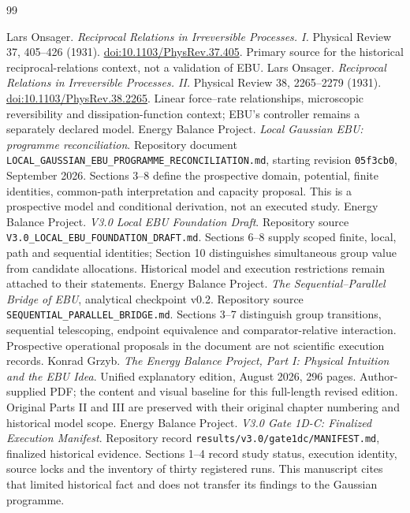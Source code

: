 \renewcommand{\bibname}{References and source map}
\begin{thebibliography}{99}
\raggedright

 Lars Onsager. \emph{Reciprocal Relations in Irreversible Processes. I.} Physical Review 37, 405--426 (1931). \href{https://doi.org/10.1103/PhysRev.37.405}{doi:10.1103/PhysRev.37.405}. Primary source for the historical reciprocal-relations context, not a validation of EBU.
 Lars Onsager. \emph{Reciprocal Relations in Irreversible Processes. II.} Physical Review 38, 2265--2279 (1931). \href{https://doi.org/10.1103/PhysRev.38.2265}{doi:10.1103/PhysRev.38.2265}. Linear force--rate relationships, microscopic reversibility and dissipation-function context; EBU's controller remains a separately declared model.
 Energy Balance Project. \emph{Local Gaussian EBU: programme reconciliation}. Repository document \texttt{LOCAL\_GAUSSIAN\_EBU\_PROGRAMME\_RECONCILIATION.md}, starting revision \texttt{05f3cb0}, September 2026. Sections 3--8 define the prospective domain, potential, finite identities, common-path interpretation and capacity proposal. This is a prospective model and conditional derivation, not an executed study.
 Energy Balance Project. \emph{V3.0 Local EBU Foundation Draft}. Repository source \texttt{V3.0\_LOCAL\_EBU\_FOUNDATION\_DRAFT.md}. Sections 6--8 supply scoped finite, local, path and sequential identities; Section 10 distinguishes simultaneous group value from candidate allocations. Historical model and execution restrictions remain attached to their statements.
 Energy Balance Project. \emph{The Sequential--Parallel Bridge of EBU}, analytical checkpoint v0.2. Repository source \texttt{SEQUENTIAL\_PARALLEL\_BRIDGE.md}. Sections 3--7 distinguish group transitions, sequential telescoping, endpoint equivalence and comparator-relative interaction. Prospective operational proposals in the document are not scientific execution records.
 Konrad Grzyb. \emph{The Energy Balance Project, Part I: Physical Intuition and the EBU Idea}. Unified explanatory edition, August 2026, 296 pages. Author-supplied PDF; the content and visual baseline for this full-length revised edition. Original Parts II and III are preserved with their original chapter numbering and historical model scope.
 Energy Balance Project. \emph{V3.0 Gate 1D-C: Finalized Execution Manifest}. Repository record \texttt{results/v3.0/gate1dc/MANIFEST.md}, finalized historical evidence. Sections 1--4 record study status, execution identity, source locks and the inventory of thirty registered runs. This manuscript cites that limited historical fact and does not transfer its findings to the Gaussian programme.
\end{thebibliography}

